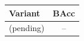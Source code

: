 \begin{tabular}{lc}
\toprule
Variant & BAcc \\
\midrule
(pending) & -- \\
\bottomrule
\end{tabular}
